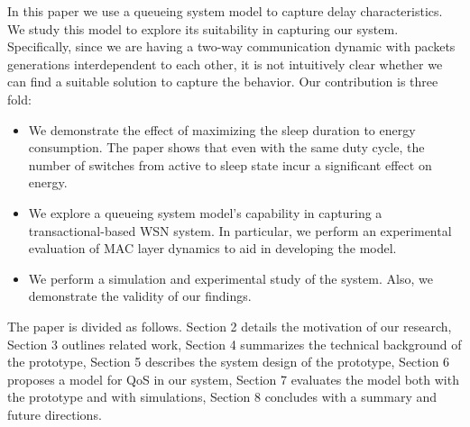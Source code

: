 In this paper we use a queueing system model to capture delay characteristics. We study this model to explore its suitability in capturing our system. Specifically, since we are having a two-way communication dynamic with packets generations interdependent to each other, it is not intuitively clear whether we can find a suitable solution to capture the behavior. Our contribution is three fold:
\begin{itemize}
\item{We demonstrate the effect of maximizing the sleep duration to energy consumption. The paper shows that even with the same duty cycle, the number of switches from active to sleep state incur a significant effect on energy.}
\item{We explore a queueing system model's capability in capturing a transactional-based WSN system. In particular, we perform an experimental evaluation of MAC layer dynamics to aid in developing the model.}
\item{We perform a simulation and experimental study of the system. Also, we demonstrate the validity of our findings.}
\end{itemize}

The paper is divided as follows. Section 2 details the motivation of our research, Section 3 outlines related work, Section 4 summarizes the technical background of the prototype, Section 5 describes the system design of the prototype, Section 6 proposes a model for QoS in our system, Section 7 evaluates the model both with the prototype and with simulations, Section 8 concludes with a summary and future directions.

